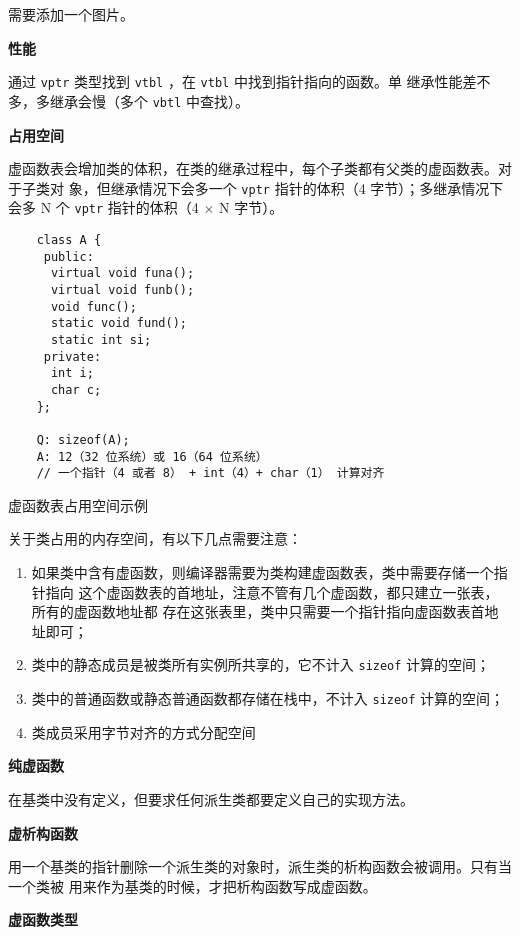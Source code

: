 需要添加一个图片。

\noindent\textbf{性能}

通过 \verb|vptr| 类型找到 \verb|vtbl| ，在 \verb|vtbl| 中找到指针指向的函数。单
继承性能差不多，多继承会慢（多个 \verb|vbtl| 中查找）。

\noindent\textbf{占用空间}

虚函数表会增加类的体积，在类的继承过程中，每个子类都有父类的虚函数表。对于子类对
象，但继承情况下会多一个 \verb|vptr| 指针的体积（4 字节）；多继承情况下会多 N 个
\verb|vptr| 指针的体积（4 $\times$ N 字节）。

\begin{sourcecode}[hbtp]
  \begin{Verbatim}
    class A {
     public:
      virtual void funa();
      virtual void funb();
      void func();
      static void fund();
      static int si;
     private:
      int i;
      char c;
    };

    Q: sizeof(A);
    A: 12（32 位系统）或 16（64 位系统）
    // 一个指针（4 或者 8） + int（4）+ char（1） 计算对齐
  \end{Verbatim}
  \caption{虚函数表占用空间示例}
\end{sourcecode}

关于类占用的内存空间，有以下几点需要注意：
\begin{enumerate}
\item 如果类中含有虚函数，则编译器需要为类构建虚函数表，类中需要存储一个指针指向
  这个虚函数表的首地址，注意不管有几个虚函数，都只建立一张表，所有的虚函数地址都
  存在这张表里，类中只需要一个指针指向虚函数表首地址即可；
\item 类中的静态成员是被类所有实例所共享的，它不计入 \verb|sizeof| 计算的空间；
\item 类中的普通函数或静态普通函数都存储在栈中，不计入 \verb|sizeof| 计算的空间；
\item 类成员采用字节对齐的方式分配空间
\end{enumerate}


\noindent\textbf{纯虚函数}

在基类中没有定义，但要求任何派生类都要定义自己的实现方法。

\noindent\textbf{虚析构函数}

用一个基类的指针删除一个派生类的对象时，派生类的析构函数会被调用。只有当一个类被
用来作为基类的时候，才把析构函数写成虚函数。

\noindent\textbf{虚函数类型}

